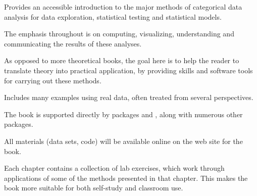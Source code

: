 \begin{itemize*}
	\item Provides an accessible introduction to the major methods of categorical data analysis
    for data exploration, statistical testing and statistical models.
	\item The emphasis throughout is on computing, visualizing, understanding and communicating
	  the results of these analyses.
  \item As opposed to more theoretical books, the goal here is to
    help the reader to translate theory into practical application, by providing skills and
    software tools for carrying out these methods.
	\item Includes many examples using real data, often treated from several perspectives.
	\item The book is supported directly by \R packages  and , along with numerous other \R packages.
	\item All materials (data sets, \R code) will be available online on the web site for the book.
  \item Each chapter contains a collection of lab exercises, which work through
    applications of some of the methods presented in that chapter.  This makes the book more suitable
    for both self-study and classroom use.
\end{itemize*}
